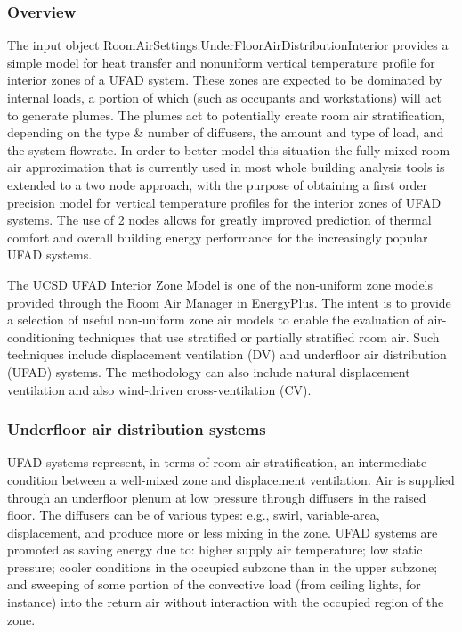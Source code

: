 \subsubsection{Overview}\label{overview-1-001}

The input object RoomAirSettings:UnderFloorAirDistributionInterior provides a simple model for heat transfer and nonuniform vertical temperature profile for interior zones of a UFAD system. These zones are expected to be dominated by internal loads, a portion of which (such as occupants and workstations) will act to generate plumes. The plumes act to potentially create room air stratification, depending on the type \& number of diffusers, the amount and type of load, and the system flowrate. In order to better model this situation the fully-mixed room air approximation that is currently used in most whole building analysis tools is extended to a two node approach, with the purpose of obtaining a first order precision model for vertical temperature profiles for the interior zones of UFAD systems. The use of 2 nodes allows for greatly improved prediction of thermal comfort and overall building energy performance for the increasingly popular UFAD systems.

The UCSD UFAD Interior Zone Model is one of the non-uniform zone models provided through the Room Air Manager in EnergyPlus. The intent is to provide a selection of useful non-uniform zone air models to enable the evaluation of air-conditioning techniques that use stratified or partially stratified room air. Such techniques include displacement ventilation (DV) and underfloor air distribution (UFAD) systems. The methodology can also include natural displacement ventilation and also wind-driven cross-ventilation (CV).

\subsubsection{Underfloor air distribution systems}\label{underfloor-air-distribution-systems}

UFAD systems represent, in terms of room air stratification, an intermediate condition between a well-mixed zone and displacement ventilation. Air is supplied through an underfloor plenum at low pressure through diffusers in the raised floor. The diffusers can be of various types: e.g., swirl, variable-area, displacement, and produce more or less mixing in the zone. UFAD systems are promoted as saving energy due to: higher supply air temperature; low static pressure; cooler conditions in the occupied subzone than in the upper subzone; and sweeping of some portion of the convective load (from ceiling lights, for instance) into the return air without interaction with the occupied region of the zone.

